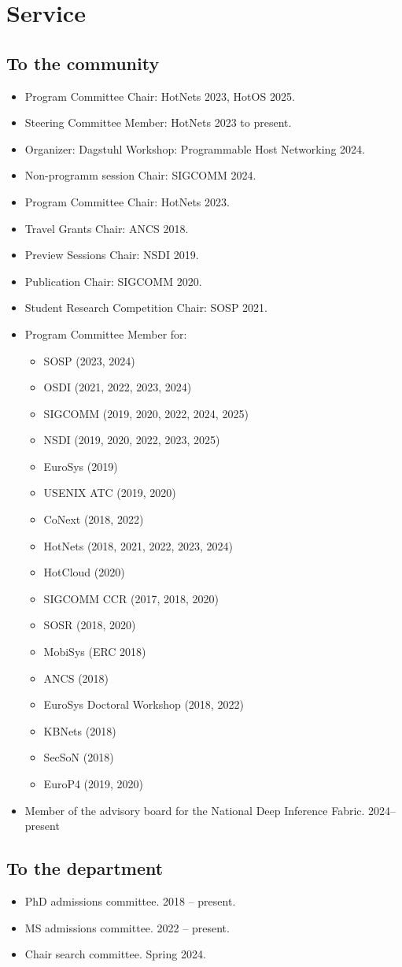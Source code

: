 \documentclass[11pt,letterpaper,sans]{moderncv}        %
\begin{document}
\section{Service}
\subsection{To the community}
\begin{itemize}
    \item Program Committee Chair: HotNets 2023, HotOS 2025.
    \item Steering Committee Member: HotNets 2023 to present.
    \item Organizer: Dagstuhl Workshop: Programmable Host Networking
        2024.
    \item Non-programm session Chair: SIGCOMM 2024.
    \item Program Committee Chair: HotNets 2023.
    \item Travel Grants Chair: ANCS 2018.
    \item Preview Sessions Chair: NSDI 2019.
    \item Publication Chair: SIGCOMM 2020. 
    \item Student Research Competition Chair: SOSP 2021. 
    \item Program Committee Member for:
        \begin{itemize}
            \item SOSP (2023, 2024)
            \item OSDI (2021, 2022, 2023, 2024)
            \item SIGCOMM (2019, 2020, 2022, 2024, 2025)
            \item NSDI (2019, 2020, 2022, 2023, 2025)
            \item EuroSys (2019)
            \item USENIX ATC (2019, 2020)
            \item CoNext (2018, 2022)
            \item HotNets (2018, 2021, 2022, 2023, 2024)
            \item HotCloud (2020)
            \item SIGCOMM CCR (2017, 2018, 2020)
            \item SOSR (2018, 2020)
            \item MobiSys (ERC 2018)
            \item ANCS (2018)
            \item EuroSys Doctoral Workshop (2018, 2022)
            \item KBNets (2018)
            \item SecSoN (2018)
            \item EuroP4 (2019, 2020)
        \end{itemize}
    \item Member of the advisory board for the National Deep Inference Fabric. 2024--present
\end{itemize}
\subsection{To the department}
\begin{itemize}
  \item PhD admissions committee. 2018 -- present.
  \item MS admissions committee. 2022 -- present.
  \item Chair search committee. Spring 2024.
\end{itemize}
\end{document}
